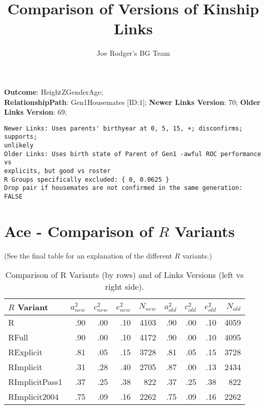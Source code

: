 \documentclass{article}\usepackage{graphicx, color}
\title{Comparison of Versions of Kinship Links}
\author{Joe Rodger's BG Team}
\makeatletter
\newenvironment{kframe}{%
 \def\at@end@of@kframe{}%
 \ifinner\ifhmode%
  \def\at@end@of@kframe{\end{minipage}}%
  \begin{minipage}{\columnwidth}%
 \fi\fi%
 \def\FrameCommand##1{\hskip\@totalleftmargin \hskip-\fboxsep
 \colorbox{shadecolor}{##1}\hskip-\fboxsep
     \hskip-\linewidth \hskip-\@totalleftmargin \hskip\columnwidth}%
 \MakeFramed {\advance\hsize-\width
   \@totalleftmargin\z@ \linewidth\hsize
   \@setminipage}}%
 {\par\unskip\endMakeFramed%
 \at@end@of@kframe}
\newenvironment{knitrout}{}{} %
\makeatother
\begin{document}
\maketitle
\setcounter{totalnumber}{8} %

\setlength{\parindent}{0pt}%







\textbf{Outcome}: HeightZGenderAge;\\
\textbf{RelationshipPath}: Gen1Housemates [ID:1];
\textbf{Newer Links Version}: 70;
\textbf{Older Links Version}: 69;

\begin{knitrout}
\color{fgcolor}\begin{kframe}
\begin{verbatim}
Newer Links: Uses parents' birthyear at 0, 5, 15, +; disconfirms; supports;
unlikely
Older Links: Uses birth state of Parent of Gen1 -awful ROC performance vs
explicits, but good vs roster
R Groups specifically excluded: { 0, 0.0625 }
Drop pair if housemates are not confirmed in the same generation: FALSE
\end{verbatim}
\end{kframe}
\end{knitrout}





\section{Ace - Comparison of $R$ Variants} 
(See the final table for an explanation of the different $R$ variants.)
\begin{table}[ht]
\centering
{\large
\begin{tabular}{l|rrrr|rrrr}
  \hline
$R$ Variant & $a_{new}^2$ & $c_{new}^2$ & $e_{new}^2$ & $N_{new}$ & $a_{old}^2$ & $c_{old}^2$ & $e_{old}^2$ & $N_{old}$ \\ 
  \hline
R & .90 & .00 & .10 & 4103 & .90 & .00 & .10 & 4059 \\ 
  RFull & .90 & .00 & .10 & 4172 & .90 & .00 & .10 & 4095 \\ 
  RExplicit & .81 & .05 & .15 & 3728 & .81 & .05 & .15 & 3728 \\ 
  RImplicit & .31 & .28 & .40 & 2705 & .87 & .00 & .13 & 2434 \\ 
  RImplicitPass1 & .37 & .25 & .38 &  822 & .37 & .25 & .38 &  822 \\ 
  RImplicit2004 & .75 & .09 & .16 & 2262 & .75 & .09 & .16 & 2262 \\ 
   \hline
\end{tabular}
}
\caption{Comparison of R Variants (by rows) and of Links Versions (left vs right side).} 
\end{table}
\end{document}
